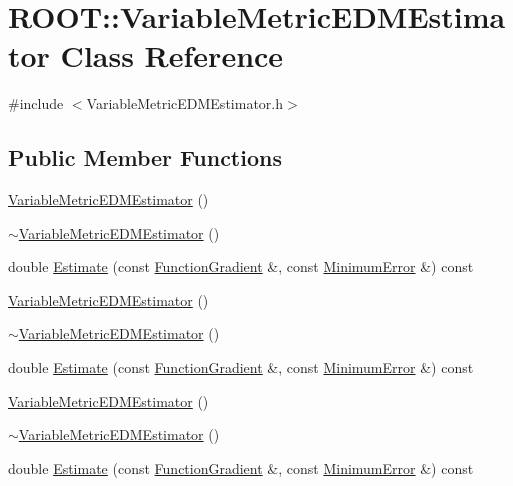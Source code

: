 \hypertarget{classROOT_1_1Minuit2_1_1VariableMetricEDMEstimator}{}\section{R\+O\+OT\+:\+:Variable\+Metric\+E\+D\+M\+Estimator Class Reference}
\label{classROOT_1_1Minuit2_1_1VariableMetricEDMEstimator}


{\ttfamily \#include $<$Variable\+Metric\+E\+D\+M\+Estimator.\+h$>$}

\subsection*{Public Member Functions}
\begin{DoxyCompactItemize}
\item 
\mbox{\hyperlink{classROOT_1_1Minuit2_1_1VariableMetricEDMEstimator_a4de1c62c58e9d452ae2b6fbdc02e01f0}{Variable\+Metric\+E\+D\+M\+Estimator}} ()
\item 
\mbox{\hyperlink{classROOT_1_1Minuit2_1_1VariableMetricEDMEstimator_a941bd6273d8a7bf2078dc79122346f87}{$\sim$\+Variable\+Metric\+E\+D\+M\+Estimator}} ()
\item 
double \mbox{\hyperlink{classROOT_1_1Minuit2_1_1VariableMetricEDMEstimator_a3c4d22f40ab9ea39de88cca47ddfcb5f}{Estimate}} (const \mbox{\hyperlink{classROOT_1_1Minuit2_1_1FunctionGradient}{Function\+Gradient}} \&, const \mbox{\hyperlink{classROOT_1_1Minuit2_1_1MinimumError}{Minimum\+Error}} \&) const
\item 
\mbox{\hyperlink{classROOT_1_1Minuit2_1_1VariableMetricEDMEstimator_a4de1c62c58e9d452ae2b6fbdc02e01f0}{Variable\+Metric\+E\+D\+M\+Estimator}} ()
\item 
\mbox{\hyperlink{classROOT_1_1Minuit2_1_1VariableMetricEDMEstimator_a941bd6273d8a7bf2078dc79122346f87}{$\sim$\+Variable\+Metric\+E\+D\+M\+Estimator}} ()
\item 
double \mbox{\hyperlink{classROOT_1_1Minuit2_1_1VariableMetricEDMEstimator_a3c4d22f40ab9ea39de88cca47ddfcb5f}{Estimate}} (const \mbox{\hyperlink{classROOT_1_1Minuit2_1_1FunctionGradient}{Function\+Gradient}} \&, const \mbox{\hyperlink{classROOT_1_1Minuit2_1_1MinimumError}{Minimum\+Error}} \&) const
\item 
\mbox{\hyperlink{classROOT_1_1Minuit2_1_1VariableMetricEDMEstimator_a4de1c62c58e9d452ae2b6fbdc02e01f0}{Variable\+Metric\+E\+D\+M\+Estimator}} ()
\item 
\mbox{\hyperlink{classROOT_1_1Minuit2_1_1VariableMetricEDMEstimator_a941bd6273d8a7bf2078dc79122346f87}{$\sim$\+Variable\+Metric\+E\+D\+M\+Estimator}} ()
\item 
double \mbox{\hyperlink{classROOT_1_1Minuit2_1_1VariableMetricEDMEstimator_a3c4d22f40ab9ea39de88cca47ddfcb5f}{Estimate}} (const \mbox{\hyperlink{classROOT_1_1Minuit2_1_1FunctionGradient}{Function\+Gradient}} \&, const \mbox{\hyperlink{classROOT_1_1Minuit2_1_1MinimumError}{Minimum\+Error}} \&) const
\end{DoxyCompactItemize}


